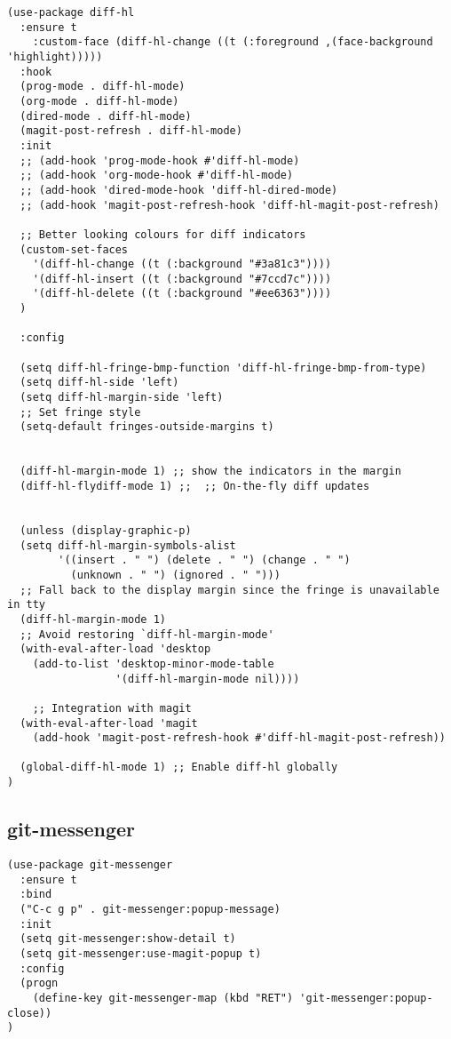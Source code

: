 \documentclass[11pt]{article}
\begin{document}
\begin{verbatim}
(use-package diff-hl
  :ensure t
    :custom-face (diff-hl-change ((t (:foreground ,(face-background 'highlight)))))
  :hook
  (prog-mode . diff-hl-mode)
  (org-mode . diff-hl-mode)
  (dired-mode . diff-hl-mode)
  (magit-post-refresh . diff-hl-mode)
  :init
  ;; (add-hook 'prog-mode-hook #'diff-hl-mode)
  ;; (add-hook 'org-mode-hook #'diff-hl-mode)
  ;; (add-hook 'dired-mode-hook 'diff-hl-dired-mode)
  ;; (add-hook 'magit-post-refresh-hook 'diff-hl-magit-post-refresh)

  ;; Better looking colours for diff indicators
  (custom-set-faces
    '(diff-hl-change ((t (:background "#3a81c3"))))
    '(diff-hl-insert ((t (:background "#7ccd7c"))))
    '(diff-hl-delete ((t (:background "#ee6363"))))
  )

  :config

  (setq diff-hl-fringe-bmp-function 'diff-hl-fringe-bmp-from-type)
  (setq diff-hl-side 'left)
  (setq diff-hl-margin-side 'left)
  ;; Set fringe style
  (setq-default fringes-outside-margins t)


  (diff-hl-margin-mode 1) ;; show the indicators in the margin
  (diff-hl-flydiff-mode 1) ;;  ;; On-the-fly diff updates


  (unless (display-graphic-p)
  (setq diff-hl-margin-symbols-alist
        '((insert . " ") (delete . " ") (change . " ")
          (unknown . " ") (ignored . " ")))
  ;; Fall back to the display margin since the fringe is unavailable in tty
  (diff-hl-margin-mode 1)
  ;; Avoid restoring `diff-hl-margin-mode'
  (with-eval-after-load 'desktop
    (add-to-list 'desktop-minor-mode-table
                 '(diff-hl-margin-mode nil))))

    ;; Integration with magit
  (with-eval-after-load 'magit
    (add-hook 'magit-post-refresh-hook #'diff-hl-magit-post-refresh))

  (global-diff-hl-mode 1) ;; Enable diff-hl globally
)
\end{verbatim}

\subsection*{git-messenger}
\label{sec:orgef0963e}

\begin{verbatim}
(use-package git-messenger
  :ensure t
  :bind
  ("C-c g p" . git-messenger:popup-message)
  :init
  (setq git-messenger:show-detail t)
  (setq git-messenger:use-magit-popup t)
  :config
  (progn
    (define-key git-messenger-map (kbd "RET") 'git-messenger:popup-close))
)
\end{verbatim}
\end{document}
